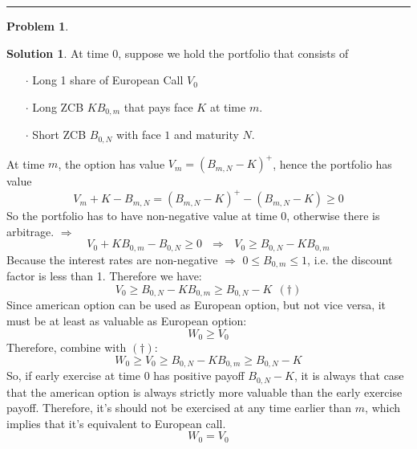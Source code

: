 \documentclass[a4paper, 10pt]{article}
\theoremstyle{definition}
\newtheorem{problem}{Problem}
\theoremstyle{hSol}
\newtheorem*{solution}{Solution}
\begin{document}
\noindent\rule{16cm}{0.4pt}
\begin{problem} 
\end{problem}
\begin{solution} At time 0, suppose we hold the portfolio that consists of
\begin{itemize}
  \item[$\cdot$] Long 1 share of European Call $V_0$
  \item[$\cdot$] Long ZCB $KB_{0, m}$ that pays face $K$ at time $m$.
  \item[$\cdot$] Short ZCB $B_{0, N}$ with face $1$ and maturity $N$.
\end{itemize}
At time $m$, the option has value $V_m=(B_{m,N}-K)^+$, hence the portfolio has value
$$
V_m + K - B_{m,N} = (B_{m,N}-K)^+ - (B_{m, N}-K) \geq 0
$$
So the portfolio has to have non-negative value at time 0, otherwise there is arbitrage. $\Rightarrow$
$$
V_0 + KB_{0,m} - B_{0,N} \geq 0~~~\Rightarrow~~~V_0 \geq B_{0,N}-KB_{0,m}
$$
Because the interest rates are non-negative $\Rightarrow$ $0\leq B_{0,m}\leq 1$, i.e. the discount factor is less than 1. Therefore we have:
$$
V_0 \geq B_{0,N}-KB_{0,m}\geq B_{0,N}-K~~(\dag)
$$
Since american option can be used as European option, but not vice versa, it must be at least as valuable as European option:
$$
W_0 \geq V_0
$$
Therefore, combine with $(\dag)$:
$$
W_0 \geq V_0  \geq B_{0,N}-KB_{0,m}\geq B_{0,N}-K
$$
So, if early exercise at time $0$ has positive payoff $B_{0,N}-K$, it is always that case that the american option is always strictly more valuable than the early exercise payoff. Therefore, it's should not be exercised at any time earlier than $m$, which implies that it's equivalent to European call.
$$
W_0 = V_0
$$ 
\end{solution}
\end{document}
